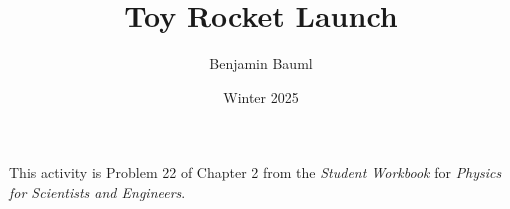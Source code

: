 \documentclass[]{article}
\title{Toy Rocket Launch}
\author{Benjamin Bauml}
\date{Winter 2025}
\newcommand{\FileDepth}{../..}
\begin{document}
\maketitle
\begin{center}
	This activity is Problem 22 of Chapter 2 from the \textit{Student Workbook} for \textit{Physics for Scientists and Engineers}.
\end{center}


\end{document}
